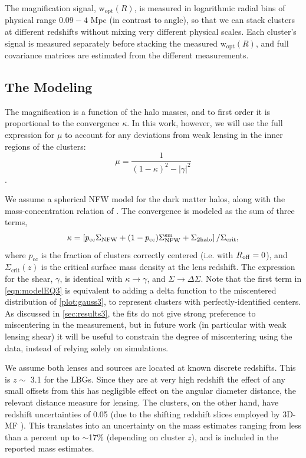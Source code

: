 The magnification signal, $\mathrm{w}_{\mathrm{opt}}(R)$, is measured in logarithmic radial bins of physical range $0.09-4$ Mpc (in contrast to angle), so that we can stack clusters at different redshifts without mixing very different physical scales. Each cluster's signal is measured separately before stacking the measured $\mathrm{w}_{\mathrm{opt}}(R)$, and full covariance matrices are estimated from the different measurements. 


\subsection{The Modeling}
\label{sec:model3}

The magnification is a function of the halo masses, and to first order it is proportional to the convergence $\kappa$. In this work, however, we will use the full expression for $\mu$ to account for any deviations from weak lensing in the inner regions of the clusters:
\begin{equation}
\mu = \frac{1}{(1-\kappa)^2 - \left|\gamma\right|^2}
\end{equation}
\citep{BS01}.

We assume a spherical \acf{NFW} model \citep{nfw97} for the dark matter halos, along with the mass-concentration relation of \citet{Prada12}. The convergence is modeled as the sum of three terms,
\begin{equation}
\kappa = \left[p_{\mathrm{cc}}\Sigma_{\mathrm{NFW}} +(1-p_{\mathrm{cc}})\Sigma_{\mathrm{NFW}}^{\rm sm} + \Sigma_{\mathrm{2halo}} \right]/\Sigma_{\mathrm{crit}},
\label{eqn:modelEQ3}
\end{equation}
where $p_{\mathrm{cc}}$ is the fraction of clusters correctly centered (i.e. with $R_{\rm{off}}=0$), and $\Sigma_{\mathrm{crit}}(z)$ is the critical surface mass density at the lens redshift. The expression for the shear, $\gamma$, is identical with $\kappa \rightarrow \gamma$, and $\Sigma \rightarrow \Delta\Sigma$. Note that the first term in \autoref{eqn:modelEQ3} is equivalent to adding a delta function to the miscentered distribution of \autoref{plot:gauss3}, to represent clusters with perfectly-identified centers. As discussed in \autoref{sec:results3}, the fits do not give strong preference to miscentering in the measurement, but in future work (in particular with weak lensing shear) it will be useful to constrain the degree of miscentering using the data, instead of relying solely on simulations.

We assume both lenses and sources are located at known discrete redshifts. This is $z \sim$ 3.1 for the \ac{LBG}s. Since they are at very high redshift the effect of any small offsets from this has negligible effect on the angular diameter distance, the relevant distance measure for lensing. The clusters, on the other hand, have redshift uncertainties of 0.05 (due to the shifting redshift slices employed by \ac{3D-MF} \citep{Milkeraitis10}). This translates into an uncertainty on the mass estimates ranging from less than a percent up to $\sim$17\% (depending on cluster $z$), and is included in the reported mass estimates.

